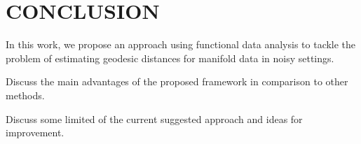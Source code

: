 \section{CONCLUSION}
In this work, we propose  an approach using functional data analysis to tackle the problem of estimating geodesic distances for manifold data in noisy settings.

Discuss the main advantages of the proposed framework in comparison to other methods.

Discuss some limited of the current suggested approach and ideas for improvement.